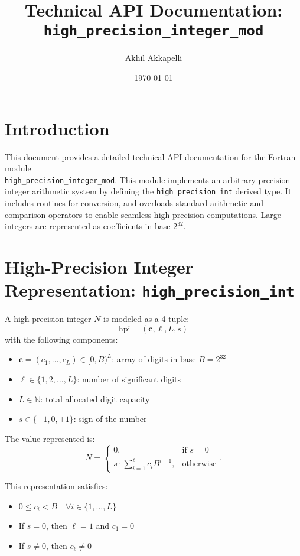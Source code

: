 \documentclass[11pt]{article}
\title{Technical API Documentation: \texttt{high\_precision\_integer\_mod}}
\author{Akhil Akkapelli}
\date{\today}
\begin{document}
	
	\maketitle
	\tableofcontents
	\newpage
	

	\section{Introduction}
	This document provides a detailed technical API documentation for the Fortran module\\ \texttt{high\_precision\_integer\_mod}. This module implements an arbitrary-precision integer arithmetic system by defining the \texttt{high\_precision\_int} derived type. It includes routines for conversion, and overloads standard arithmetic and comparison operators to enable seamless high-precision computations. Large integers are represented as coefficients in base $2^{32}$.

	\section{High-Precision Integer Representation: \texttt{high\_precision\_int}}

	A high-precision integer \( N \) is modeled as a 4-tuple:
	\[ 
	\text{hpi} = (\mathbf{c}, \ell, L, s)
	\]
	with the following components:
	\begin{itemize}
	\item \( \mathbf{c} = (c_1, \dots, c_L) \in [0, B)^L \): array of digits in base \( B = 2^{32} \)
	\item \( \ell \in \{1, 2, \dots, L\} \): number of significant digits
	\item \( L \in \mathbb{N} \): total allocated digit capacity
	\item \( s \in \{-1, 0, +1\} \): sign of the number
	\end{itemize}

	The value represented is:
	\begin{equation}
	N =
	\begin{cases}
		0, & \text{if } s = 0 \\
		s \cdot \sum_{i=1}^{\ell} c_i B^{i-1}, & \text{otherwise}
	\end{cases}.
	\end{equation}

	This representation satisfies:
	\begin{itemize}
	\item \( 0 \le c_i < B \quad \forall i \in \{1, \dots, L\} \)
	\item If \( s = 0 \), then \( \ell = 1 \) and \( c_1 = 0 \)
	\item If \( s \neq 0 \), then \( c_\ell \ne 0 \)
	\end{itemize}
\end{document}
